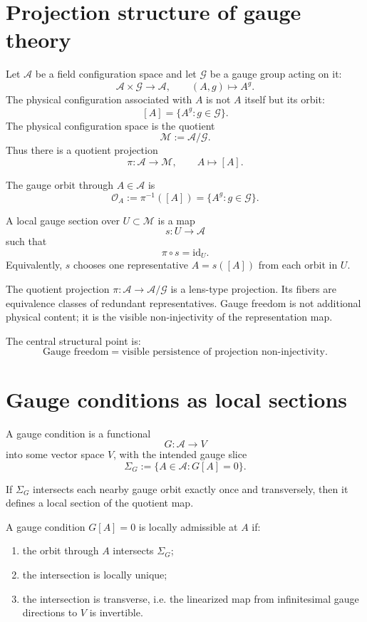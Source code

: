 \documentclass[11pt]{article}
\newcommand{\A}{\mathcal A}
\newcommand{\G}{\mathcal G}
\newcommand{\M}{\mathcal M}
\newcommand{\id}{\mathrm{id}}
\begin{document}
\section{Projection structure of gauge theory}

Let \(\A\) be a field configuration space and let \(\G\) be a gauge group acting on it:
\[
\A\times\G\to\A,\qquad (A,g)\mapsto A^g.
\]
The physical configuration associated with \(A\) is not \(A\) itself but its orbit:
\[
[A]=\{A^g:g\in\G\}.
\]
The physical configuration space is the quotient
\[
\M:=\A/\G.
\]
Thus there is a quotient projection
\[
\pi:\A\to\M,\qquad A\mapsto [A].
\]

\begin{definition}
The gauge orbit through \(A\in\A\) is
\[
\mathcal O_A:=\pi^{-1}([A])=\{A^g:g\in\G\}.
\]
\end{definition}

\begin{definition}
A local gauge section over \(U\subset\M\) is a map
\[
s:U\to\A
\]
such that
\[
\pi\circ s=\id_U.
\]
Equivalently, \(s\) chooses one representative \(A=s([A])\) from each orbit in \(U\).
\end{definition}

\begin{remark}
The quotient projection \(\pi:\A\to\A/\G\) is a lens-type projection. Its fibers are equivalence classes of redundant representatives. Gauge freedom is not additional physical content; it is the visible non-injectivity of the representation map.
\end{remark}

The central structural point is:
\[
\boxed{\text{Gauge freedom}=\text{visible persistence of projection non-injectivity}.}
\]

\section{Gauge conditions as local sections}

A gauge condition is a functional
\[
G:\A\to V
\]
into some vector space \(V\), with the intended gauge slice
\[
\Sigma_G:=\{A\in\A:G[A]=0\}.
\]

If \(\Sigma_G\) intersects each nearby gauge orbit exactly once and transversely, then it defines a local section of the quotient map.

\begin{definition}
A gauge condition \(G[A]=0\) is locally admissible at \(A\) if:
\begin{enumerate}
\item the orbit through \(A\) intersects \(\Sigma_G\);
\item the intersection is locally unique;
\item the intersection is transverse, i.e. the linearized map from infinitesimal gauge directions to \(V\) is invertible.
\end{enumerate}
\end{definition}
\end{document}
